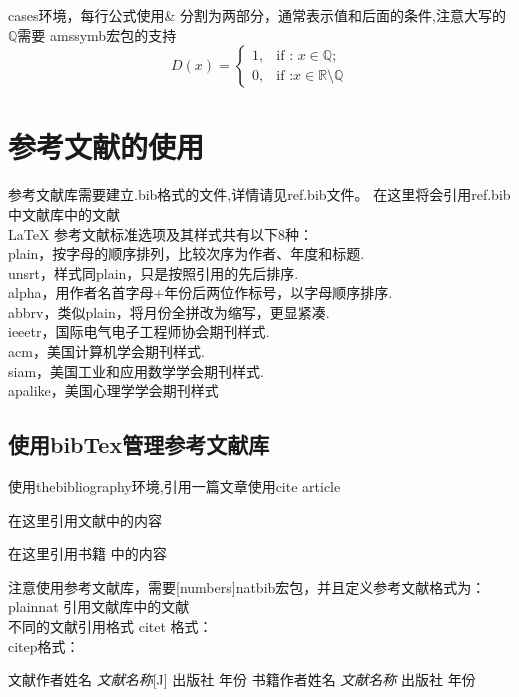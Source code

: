 \documentclass{ctexart}
\begin{document}
    cases环境，每行公式使用\& 分割为两部分，通常表示值和后面的条件,注意大写的$\mathbb{Q}$需要
    amssymb宏包的支持
    \begin{equation}
        D(x) = \begin{cases}
            1, & \text{if : } x\in\mathbb{Q}; \\
            0, & \text{if :} x \in \mathbb{R} \setminus \mathbb{Q}
        \end{cases}
    \end{equation}

    \section{参考文献的使用}

    参考文献库需要建立.bib格式的文件,详情请见ref.bib文件。
    在这里将会引用ref.bib中文献库中的文献\\
    LaTeX 参考文献标准选项及其样式共有以下8种：\\
    plain，按字母的顺序排列，比较次序为作者、年度和标题.\\
    unsrt，样式同plain，只是按照引用的先后排序.\\
    alpha，用作者名首字母+年份后两位作标号，以字母顺序排序.\\
    abbrv，类似plain，将月份全拼改为缩写，更显紧凑.\\
    ieeetr，国际电气电子工程师协会期刊样式.\\
    acm，美国计算机学会期刊样式.\\
    siam，美国工业和应用数学学会期刊样式.\\
    apalike，美国心理学学会期刊样式\\
    
    \subsection{使用bibTex管理参考文献库}

    使用thebibliography环境,引用一篇文章使用cite article

    在这里引用文献\cite{article1}中的内容

    在这里引用书籍\cite{book1} 中的内容

    注意使用参考文献库，需要[numbers]{natbib}宏包，并且定义参考文献格式为：plainnat
    引用文献库中的文献\cite{heilman2010good} \\
    不同的文献引用格式 citet 格式：\citet{heilman2010good} \\
    citep格式： \citep{heilman2010good}
    
    

    \begin{thebibliography}{99}
        文献作者姓名 \emph{文献名称}[J] 出版社 年份
         书籍作者姓名 \emph{文献名称} 出版社  年份
    \end{thebibliography}
    
\end{document}
